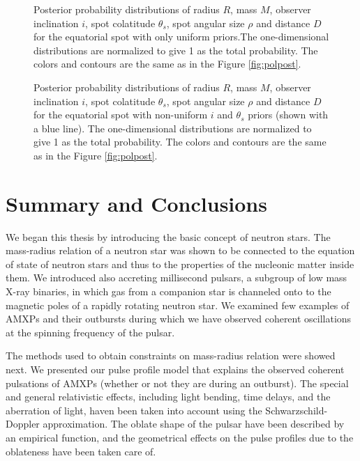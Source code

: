 \documentclass{wihuri}
\def\thetas{\theta_{s}}
\begin{document}
\begin{figure}
\centerline{}
\caption{Posterior probability distributions of radius $R$, mass $M$, observer inclination $i$, spot colatitude $\thetas$, spot angular size $\rho$ and distance $D$ for the equatorial spot with only uniform priors.The one-dimensional distributions are normalized to give 1 as the total probability. The colors and contours are the same as in the Figure \ref{fig:polpost}.
\label{fig:eqpost}}
\end{figure}



\begin{figure}
\centerline{}
\caption{Posterior probability distributions of radius $R$, mass $M$, observer inclination $i$, spot colatitude $\theta_{s}$, spot angular size $\rho$ and distance $D$ for the equatorial spot with non-uniform $i$ and $\thetas$ priors (shown with a blue line). The one-dimensional distributions are normalized to give 1 as the total probability. The colors and contours are the same as in the Figure \ref{fig:polpost}.
\label{fig:eqpostpr}}
\end{figure}



\clearpage


\section{Summary and Conclusions}

We began this thesis by introducing the basic concept of neutron stars. The mass-radius relation of a neutron star was shown to be connected to the equation of state of neutron stars and thus to the properties of the nucleonic matter inside them. We introduced also accreting millisecond pulsars, a subgroup of low mass X-ray binaries, in which gas from a companion star is channeled onto to the magnetic poles of a rapidly rotating neutron star. We examined few examples of AMXPs and their outbursts during which we have observed coherent oscillations at the spinning frequency of the pulsar.

The methods used to obtain constraints on mass-radius relation were showed next. We presented our pulse profile model that explains the observed coherent pulsations of AMXPs (whether or not they are during an outburst). %
The special and general relativistic effects, including light bending, time delays, and the aberration of light, haven been taken into account using the Schwarzschild-Doppler approximation. The oblate shape of the pulsar have been described by an empirical function, and the geometrical effects on the pulse profiles due to the oblateness have been taken care of. 
\end{document}

